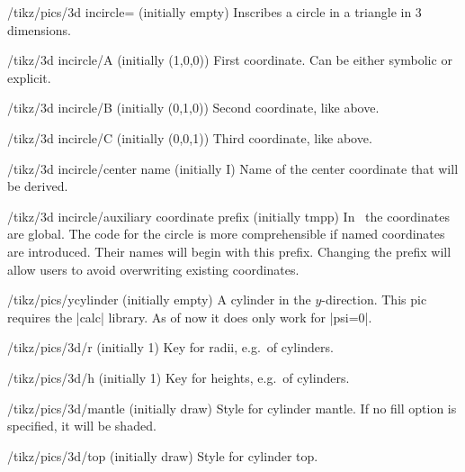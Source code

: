 \documentclass[a4paper,fleqn]{ltxdoc}
\begin{document}
\begin{key}{/tikz/pics/3d incircle= (initially empty)}
        Inscribes a circle in a triangle in 3 dimensions.
\end{key}
\begin{key}{/tikz/3d incircle/A (initially {(1,0,0)})}
        First coordinate. Can be either symbolic or explicit. 
\end{key}
\begin{key}{/tikz/3d incircle/B (initially {(0,1,0)})}
        Second coordinate, like above.
\end{key}
\begin{key}{/tikz/3d incircle/C (initially {(0,0,1)})}
        Third coordinate, like above.
\end{key}
\begin{key}{/tikz/3d incircle/center name (initially {I})}
        Name of the center coordinate that will be derived.
\end{key}
\begin{key}{/tikz/3d incircle/auxiliary coordinate prefix (initially {tmpp})}
		In \tikzname\ the coordinates are global. The code for the circle is
		more comprehensible if named coordinates are introduced. Their names
		will begin with this prefix. Changing the prefix will allow users to
		avoid overwriting existing coordinates.
\end{key}

\begin{codeexample}[width=2.5cm]
\end{codeexample}


\begin{key}{/tikz/pics/ycylinder (initially empty)}
 A cylinder in the $y$-direction. This pic requires the |calc| library. 
 As of now it does only work for |psi=0|.
\end{key}
\begin{key}{/tikz/pics/3d/r (initially 1)}
 Key for radii, e.g.\ of cylinders.
\end{key}
\begin{key}{/tikz/pics/3d/h (initially 1)}
 Key for heights,  e.g.\ of cylinders.
\end{key}
\begin{key}{/tikz/pics/3d/mantle (initially draw)}
 Style for cylinder mantle. If no fill option is specified, it will be shaded.
\end{key}
\begin{key}{/tikz/pics/3d/top (initially draw)}
 Style for cylinder top. 
\end{key}
\end{document}
